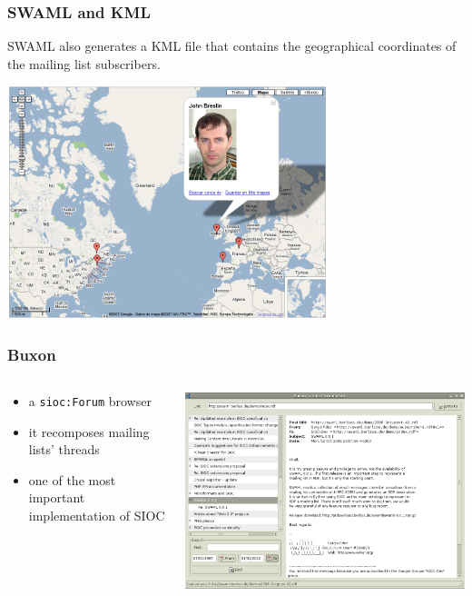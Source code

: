 \documentclass[spanish,notes=hide]{beamer}
\begin{document}
\frame
{
  \frametitle{SWAML and KML}

  SWAML also generates a KML file that contains the geographical coordinates 
  of the mailing list subscribers.

  \begin{center}
    \includegraphics[width=0.7\textwidth]{images/googlemaps.png}
  \end{center}
}
\frame
{
  \frametitle{Buxon}

  \begin{columns}
   \begin{column}{0.32\textwidth}
	\begin{itemize}
	  \item a \texttt{sioc:Forum} browser
	  \item it recomposes mailing lists' threads
	  \item one of the most important implementation of SIOC
	\end{itemize}
   \end{column}
   \begin{column}{0.68\textwidth}
	\includegraphics[width=\textwidth]{images/buxon.png}
   \end{column}
  \end{columns}
}
\end{document}
